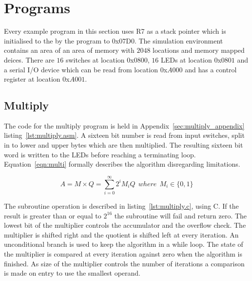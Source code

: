 

\section{Programs}
Every example program in this section uses R7 as a stack pointer which is initialised to the by the program to 0x07D0.%
The simulation environment contains an area of an area of memory with $2048$ locations and memory mapped deices.
There are $16$ switches at location $0$x$0800$, $16$ LEDs at location $0$x$0801$ and a serial I/O device which can be read from location $0$x$A000$ and has a control register at location $0$x$A001$. 




\subsection{Multiply}
\label{sec:multiply}
The code for the multiply program is held in Appendix~\ref{sec:multiply_appendix} listing~\ref{lst:multiply.asm}.
A sixteen bit number is read from input switches, split in to lower and upper bytes which are then multiplied.
The resulting sixteen bit word is written to the LEDs before reaching a terminating loop.
Equation~\eqref{eqn:multi} formally describes the algorithm disregarding limitations.

\begin{equation}
	A = M \times Q = \sum_{i=0}^{\infty} 2^i M_i Q\:\:where\:\:M_i \in \{0,1\}
   \label{eqn:multi}
\end{equation}



The subroutine operation is described in listing~\ref{lst:multiply.c}, using C. 
If the result is greater than or equal to $2^{16}$ the subroutine will fail and return zero.
The lowest bit of the multiplier controls the accumulator and the overflow check.
The multiplier is shifted right and the quotient is shifted left at every iteration.
An unconditional branch is used to keep the algorithm in a while loop. 
The state of the multiplier is compared at every iteration against zero when the algorithm is finished.
As size of the multiplier controls the number of iterations a comparison is made on entry to use the smallest operand.










